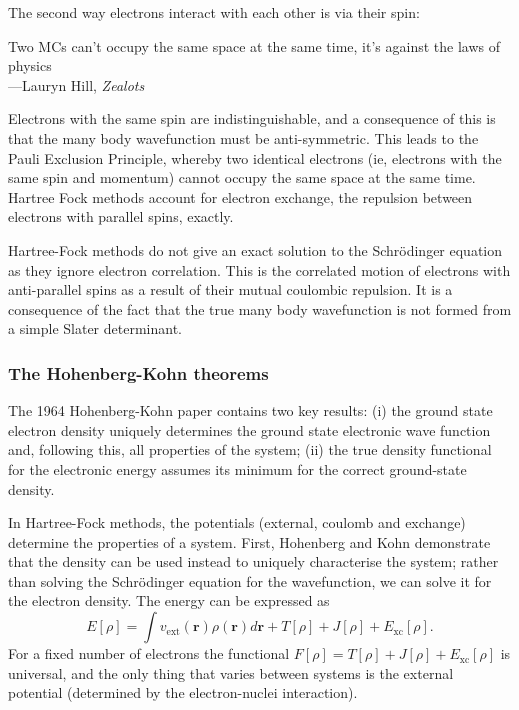 The second way electrons interact with each other is via their spin:
\begin{displayquote}
    Two MCs can't occupy the same space at the same time,
    it's against the laws of physics \\ \hspace{2cm}---Lauryn Hill, \textit{Zealots}
\end{displayquote}
Electrons with the same spin are indistinguishable, and a consequence of this is that the many body  wavefunction must be anti-symmetric. This leads to the Pauli Exclusion Principle, whereby two identical electrons (ie, electrons with the same spin and momentum) cannot occupy the same space at the same time. Hartree Fock methods account for electron exchange, the repulsion between electrons with parallel spins, exactly. 

Hartree-Fock methods do not give an exact solution to the Schr\"{o}dinger equation as they ignore electron correlation. This is the correlated motion of electrons with anti-parallel spins as a result of their mutual coulombic repulsion. It is a consequence of the fact that the true many body wavefunction is not formed from a simple Slater determinant.

\subsubsection{The Hohenberg-Kohn theorems}

The 1964 Hohenberg-Kohn paper contains two key results: (i) the ground state electron density uniquely determines the ground state electronic wave function and, following this, all properties of the system; (ii) the true density functional for the electronic energy assumes its minimum for the correct ground-state density. %

In Hartree-Fock methods, the potentials (external, coulomb and exchange) determine the properties of a system. First, Hohenberg and Kohn demonstrate that the density can be used instead to uniquely characterise the system; rather than solving the Schr\"{o}dinger equation for the wavefunction, we can solve it for the electron density. The energy can be expressed as
$$E\left[\rho\right]=\int v_{\textrm{ext}}(\textbf{r})\rho(\textbf{r})d\textbf{r}+T\left[\rho\right]+J\left[\rho\right]+E_{\textrm{xc}}\left[\rho\right].$$
For a fixed number of electrons the functional $F\left[\rho\right]=T\left[\rho\right]+J\left[\rho\right]+E_{\textrm{xc}}\left[\rho\right]$ is universal, and the only thing that varies between systems is the external potential (determined by the electron-nuclei interaction). 

